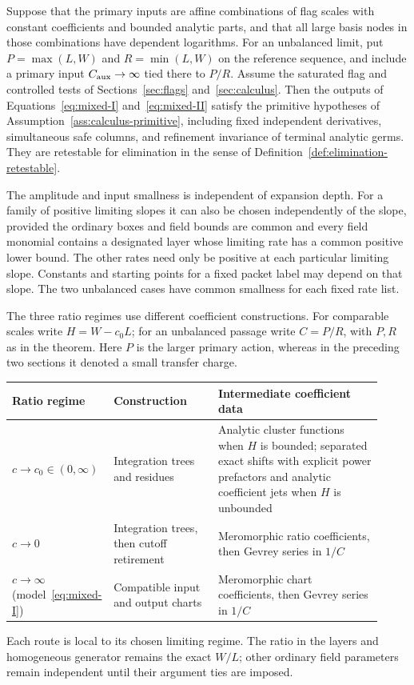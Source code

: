 \begin{theorem}\label{thm:mixed-packets}
Suppose that the primary inputs are affine combinations of flag scales
with constant coefficients and bounded analytic parts, and that all
large basis nodes in those combinations have dependent logarithms.
For an unbalanced limit, put $P=\max(L,W)$ and $R=\min(L,W)$ on the
reference sequence, and include a primary input $C_{\rm aux}\to\infty$
tied there to $P/R$. Assume the saturated flag and controlled tests of
Sections~\ref{sec:flags} and~\ref{sec:calculus}. Then the outputs of
Equations~\eqref{eq:mixed-I} and~\eqref{eq:mixed-II} satisfy the
primitive hypotheses of Assumption~\ref{ass:calculus-primitive},
including fixed independent derivatives, simultaneous safe columns,
and refinement invariance of terminal analytic germs. They are
retestable for elimination in the sense of
Definition~\ref{def:elimination-retestable}.

The amplitude and input smallness is independent of expansion depth.
For a family of positive limiting slopes it can also be chosen
independently of the slope, provided the ordinary boxes and field
bounds are common and every field monomial contains a designated
layer whose limiting rate has a common positive lower bound. The
other rates need only be positive at each particular limiting slope.
Constants and starting points for a fixed packet label may depend on
that slope. The two unbalanced cases have common smallness for each
fixed rate list.
\end{theorem}

The three ratio regimes use different coefficient constructions.
For comparable scales write $H=W-c_0L$; for an unbalanced passage
write $C=P/R$, with $P,R$ as in the theorem.  Here $P$ is the
larger primary action, whereas in the preceding two sections it
denoted a small transfer charge.
\begin{center}
\small
\begin{tabular}{@{}>{\raggedright\arraybackslash}p{0.20\linewidth}>{\raggedright\arraybackslash}p{0.28\linewidth}>{\raggedright\arraybackslash}p{0.44\linewidth}@{}}
\toprule
Ratio regime & Construction & Intermediate coefficient data\\
\midrule
$c\to c_0\in(0,\infty)$ & Integration trees and residues
 & Analytic cluster functions when $H$ is bounded; separated exact
shifts with explicit power prefactors and analytic coefficient jets
when $H$ is unbounded\\[3pt]
$c\to0$ & Integration trees, then cutoff retirement
 & Meromorphic ratio coefficients, then Gevrey series in $1/C$\\[3pt]
$c\to\infty$ (model~\eqref{eq:mixed-I}) & Compatible input and output charts
 & Meromorphic chart coefficients, then Gevrey series in $1/C$\\
\bottomrule
\end{tabular}
\end{center}
Each route is local to its chosen limiting regime.  The ratio in
the layers and homogeneous generator remains the exact $W/L$;
other ordinary field parameters remain independent until their
argument ties are imposed.

